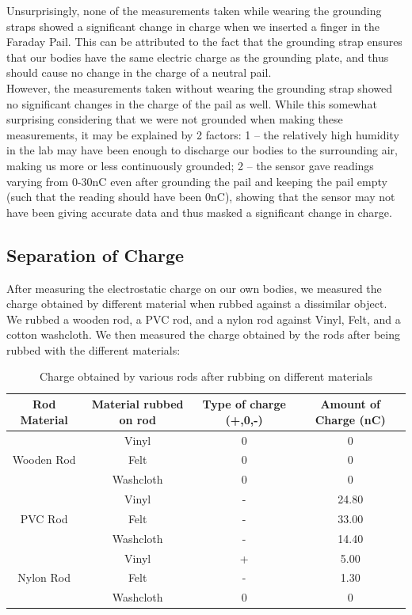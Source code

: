 \documentclass[oneside,12pt]{amsart}
\begin{document}
\indent Unsurprisingly, none of the measurements taken while wearing the grounding straps showed a significant change in charge when we inserted a finger in the Faraday Pail. This can be attributed to the fact that the grounding strap ensures that our bodies have the same electric charge as the grounding plate, and thus should cause no change in the charge of a neutral pail.\\
\indent However, the measurements taken without wearing the grounding strap showed no significant changes in the charge of the pail as well. While this somewhat surprising considering that we were not grounded when making these measurements, it may be explained by 2 factors: 1 -- the relatively high humidity in the lab may have been enough to discharge our bodies to the surrounding air, making us more or less continuously grounded; 2 -- the sensor gave readings varying from 0-30nC even after grounding the pail and keeping the pail empty (such that the reading should have been 0nC), showing that the sensor may not have been giving accurate data and thus masked a significant change in charge. 

\subsection{Separation of Charge}
\indent After measuring the electrostatic charge on our own bodies, we measured the charge obtained by different material when rubbed against a dissimilar object. We rubbed a wooden rod, a PVC rod, and a nylon rod against Vinyl, Felt, and a cotton washcloth. We then measured the charge obtained by the rods after being rubbed with the different materials:
\begin{table}[H]
	\begin{tabular}{ |c|c||c|c|}
		\hline
	
		\hline
		Rod Material & Material rubbed on rod& Type of charge (+,0,-)&Amount of Charge (nC)\\
		\hline
		\multirow{3}{*}{Wooden Rod} &Vinyl&0&0\\
		 &Felt&0&0\\
		&Washcloth&0&0\\
		\hline	
		\multirow{3}{*}{PVC Rod}&Vinyl&-&24.80\\
		&Felt&-&33.00\\
		&Washcloth&-&14.40\\
		\hline
		\multirow{3}{*}{Nylon Rod} &Vinyl&+&5.00\\
		&Felt&-&1.30\\
		&Washcloth&0&0\\
		\hline	
	\end{tabular}
\caption{Charge obtained by various rods after rubbing on different materials}
\end{table}
\end{document}
